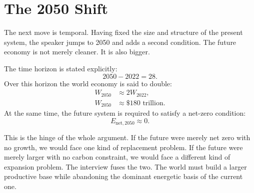 \section{The 2050 Shift}

The next move is temporal. Having fixed the size and structure of the present system, the speaker jumps to 2050 and adds a second condition. The future economy is not merely cleaner. It is also bigger.

The time horizon is stated explicitly:
\begin{equation}
2050 - 2022 = 28.
\end{equation}
Over this horizon the world economy is said to double:
\begin{align}
W_{2050} &\approx 2W_{2022},\\
W_{2050} &\approx \$180\text{ trillion}.
\end{align}
At the same time, the future system is required to satisfy a net-zero condition:
\begin{equation}
E_{\mathrm{net},2050} \approx 0.
\end{equation}

This is the hinge of the whole argument. If the future were merely net zero with no growth, we would face one kind of replacement problem. If the future were merely larger with no carbon constraint, we would face a different kind of expansion problem. The interview fuses the two. The world must build a larger productive base while abandoning the dominant energetic basis of the current one.

\begin{figure}
\centering
{}
\end{figure}

